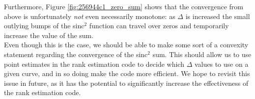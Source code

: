 Furthermore, Figure \ref{fig:256944c1_zero_sum} shows that the convergence from above is unfortunately {\it not} even necessarily monotone: as $\Delta$ is increased the small outlying bumps of the sinc$^2$ function can travel over zeros and temporarily increase the value of the sum. \\

Even though this is the case, we should be able to make some sort of a convexity statement regarding the convergence of the sinc$^2$ sum. This should allow us to use point estimates in the rank estimation code to decide which $\Delta$ values to use on a given curve, and in so doing make the code more efficient. We hope to revisit this issue in future, as it has the potential to significantly increase the effectiveness of the rank estimation code.


